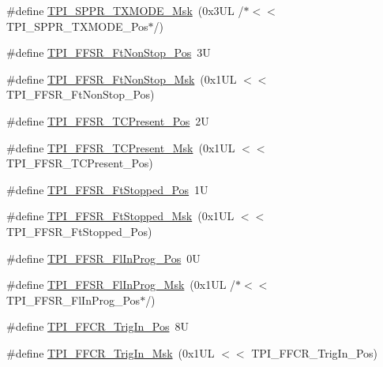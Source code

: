 \begin{DoxyCompactItemize}
\item 
\#define \hyperlink{group___c_m_s_i_s___t_p_i_gaca085c8a954393d70dbd7240bb02cc1f}{T\+P\+I\+\_\+\+S\+P\+P\+R\+\_\+\+T\+X\+M\+O\+D\+E\+\_\+\+Msk}~(0x3\+U\+L /$\ast$$<$$<$ T\+P\+I\+\_\+\+S\+P\+P\+R\+\_\+\+T\+X\+M\+O\+D\+E\+\_\+\+Pos$\ast$/)
\item 
\#define \hyperlink{group___c_m_s_i_s___t_p_i_ga9537b8a660cc8803f57cbbee320b2fc8}{T\+P\+I\+\_\+\+F\+F\+S\+R\+\_\+\+Ft\+Non\+Stop\+\_\+\+Pos}~3U
\item 
\#define \hyperlink{group___c_m_s_i_s___t_p_i_gaaa313f980974a8cfc7dac68c4d805ab1}{T\+P\+I\+\_\+\+F\+F\+S\+R\+\_\+\+Ft\+Non\+Stop\+\_\+\+Msk}~(0x1\+U\+L $<$$<$ T\+P\+I\+\_\+\+F\+F\+S\+R\+\_\+\+Ft\+Non\+Stop\+\_\+\+Pos)
\item 
\#define \hyperlink{group___c_m_s_i_s___t_p_i_gad30fde0c058da2ffb2b0a213be7a1b5c}{T\+P\+I\+\_\+\+F\+F\+S\+R\+\_\+\+T\+C\+Present\+\_\+\+Pos}~2U
\item 
\#define \hyperlink{group___c_m_s_i_s___t_p_i_ga0d6bfd263ff2fdec72d6ec9415fb1135}{T\+P\+I\+\_\+\+F\+F\+S\+R\+\_\+\+T\+C\+Present\+\_\+\+Msk}~(0x1\+U\+L $<$$<$ T\+P\+I\+\_\+\+F\+F\+S\+R\+\_\+\+T\+C\+Present\+\_\+\+Pos)
\item 
\#define \hyperlink{group___c_m_s_i_s___t_p_i_gaedf31fd453a878021b542b644e2869d2}{T\+P\+I\+\_\+\+F\+F\+S\+R\+\_\+\+Ft\+Stopped\+\_\+\+Pos}~1U
\item 
\#define \hyperlink{group___c_m_s_i_s___t_p_i_ga1ab6c3abe1cf6311ee07e7c479ce5f78}{T\+P\+I\+\_\+\+F\+F\+S\+R\+\_\+\+Ft\+Stopped\+\_\+\+Msk}~(0x1\+U\+L $<$$<$ T\+P\+I\+\_\+\+F\+F\+S\+R\+\_\+\+Ft\+Stopped\+\_\+\+Pos)
\item 
\#define \hyperlink{group___c_m_s_i_s___t_p_i_ga542ca74a081588273e6d5275ba5da6bf}{T\+P\+I\+\_\+\+F\+F\+S\+R\+\_\+\+Fl\+In\+Prog\+\_\+\+Pos}~0U
\item 
\#define \hyperlink{group___c_m_s_i_s___t_p_i_ga63dfb09259893958962914fc3a9e3824}{T\+P\+I\+\_\+\+F\+F\+S\+R\+\_\+\+Fl\+In\+Prog\+\_\+\+Msk}~(0x1\+U\+L /$\ast$$<$$<$ T\+P\+I\+\_\+\+F\+F\+S\+R\+\_\+\+Fl\+In\+Prog\+\_\+\+Pos$\ast$/)
\item 
\#define \hyperlink{group___c_m_s_i_s___t_p_i_gaa7ea11ba6ea75b541cd82e185c725b5b}{T\+P\+I\+\_\+\+F\+F\+C\+R\+\_\+\+Trig\+In\+\_\+\+Pos}~8U
\item 
\#define \hyperlink{group___c_m_s_i_s___t_p_i_ga360b413bc5da61f751546a7133c3e4dd}{T\+P\+I\+\_\+\+F\+F\+C\+R\+\_\+\+Trig\+In\+\_\+\+Msk}~(0x1\+U\+L $<$$<$ T\+P\+I\+\_\+\+F\+F\+C\+R\+\_\+\+Trig\+In\+\_\+\+Pos)
\item 

\end{DoxyCompactItemize}
